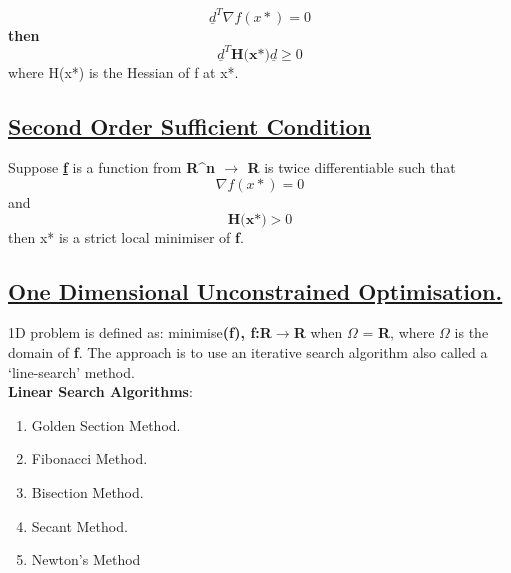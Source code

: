\documentclass[12pt,a4paper,titlepage]{article}
\begin{document}
\begin{equation}
    \underline{d}^T \nabla f(x*)= 0 \label{eq3}
\end{equation}
\textbf{then}
\begin{equation}
    \underline{d}^T \textbf{H(x*)} \underline{d} \geq 0 \label{eq4}
\end{equation}
where H(x*) is the Hessian of f at x*.

\subsection{\underline{Second Order Sufficient Condition}}
Suppose \textbf{\underline{f}} is a function from \textbf{R^n $\rightarrow$ R} is twice differentiable such that 
\begin{equation}
    \nabla f(x*)=0    
\end{equation}
and
\begin{equation}
    \textbf{H(x*)} > 0
\end{equation}
then x* is a strict local minimiser of \textbf{f}.

\subsection{\underline{One Dimensional Unconstrained Optimisation.}}
1D problem is defined as:
minimise\textbf{(f), f:R$\rightarrow$R} when $\Omega$ = \textbf{R}, where $\Omega$ is the domain of \textbf{f}.
The approach is to use an iterative search algorithm also called a `line-search' method. \\
\textbf{Linear Search Algorithms}: 
\begin{enumerate}
    \item Golden Section Method.
    \item Fibonacci Method.
    \item Bisection Method.
    \item Secant Method.
    \item Newton's Method
\end{enumerate}
\end{document}
